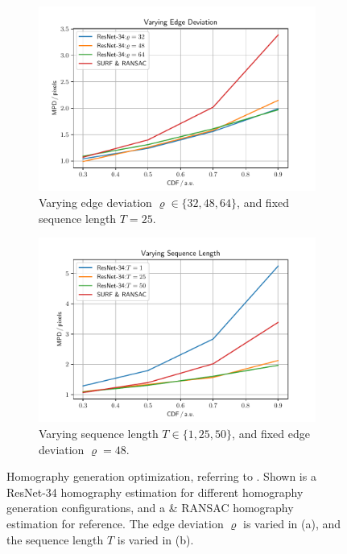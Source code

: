 \begin{figure}[tb]
\centering
\begin{subfigure}[b]{0.49\textwidth}
    \centering
    \includegraphics[width=\textwidth]{fig/frac/var_rho.pdf}
    \caption{Varying edge deviation $\varrho\in\{32,48,64\}$, and fixed sequence length $T=25$.}
    \label{c3:fig:resnet34_a}
\end{subfigure}
\begin{subfigure}[b]{0.49\textwidth}
    \centering
    \includegraphics[width=\textwidth]{fig/frac/var_seq.pdf}
    \caption{Varying sequence length $T\in\{1,25,50\}$, and fixed edge deviation $\varrho=48$.}
    \label{c3:fig:resnet34_b}
\end{subfigure}
\caption{Homography generation optimization, referring to . Shown is a ResNet-34 homography estimation for different homography generation configurations, and a  \& RANSAC homography estimation for reference. The edge deviation $\varrho$ is varied in (a), and the sequence length $T$ is varied in (b).}
\label{c3:fig:resnet34}
\end{figure}

